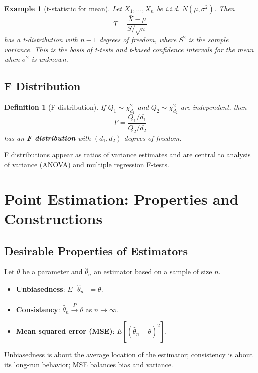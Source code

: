 \documentclass[11pt,a4paper]{article}
\newtheorem{definition}{Definition}[section]
\newtheorem{example}{Example}[section]
\begin{document}
\begin{example}[t-statistic for mean]
Let $X_1,\dots,X_n$ be i.i.d. $N(\mu,\sigma^2)$. 
Then
\[
T = \frac{\bar{X} - \mu}{S/\sqrt{n}}
\]
has a t-distribution with $n-1$ degrees of freedom, where $S^2$ is the sample variance. 
This is the basis of t-tests and t-based confidence intervals for the mean when $\sigma^2$ is unknown.

\end{example}

\subsection{F Distribution}

\begin{definition}[F distribution]
If $Q_1 \sim \chi_{d_1}^2$ and $Q_2 \sim \chi_{d_2}^2$ are independent, then
\[
F = \frac{Q_1/d_1}{Q_2/d_2}
\]
has an \textbf{F distribution} with $(d_1,d_2)$ degrees of freedom.
\end{definition}

F distributions appear as ratios of variance estimates and are central to analysis of variance (ANOVA) and multiple regression F-tests.

\newpage

\section{Point Estimation: Properties and Constructions}

\subsection{Desirable Properties of Estimators}

Let $\theta$ be a parameter and $\hat{\theta}_n$ an estimator based on a sample of size $n$.

\begin{itemize}
    \item \textbf{Unbiasedness}: $E[\hat{\theta}_n] = \theta$.
    \item \textbf{Consistency}: $\hat{\theta}_n \xrightarrow{P} \theta$ as $n\to\infty$.
    \item \textbf{Mean squared error (MSE)}: $E[(\hat{\theta}_n - \theta)^2]$.
\end{itemize}

Unbiasedness is about the average location of the estimator; consistency is about its long-run behavior; MSE balances bias and variance.
\end{document}
